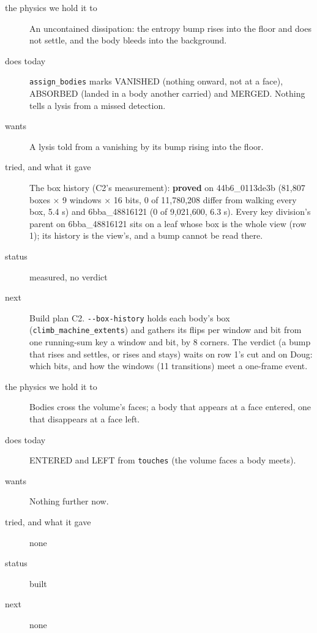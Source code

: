 \begin{description}
\item[{the physics we hold it to}] An uncontained dissipation: the entropy bump rises into the floor and does not settle, and the body bleeds into the background.
\item[{does today}] \texttt{assign\_\allowbreak{}bodies} marks VANISHED (nothing onward, not at a face), ABSORBED (landed in a body another carried) and MERGED. Nothing tells a lysis from a missed detection.
\item[{wants}] A lysis told from a vanishing by its bump rising into the floor.
\item[{tried, and what it gave}] The box history (C2's measurement): \textbf{proved} on 44b6\_\allowbreak{}0113de3b (81,807 boxes × 9 windows × 16 bits, 0 of 11,780,208 differ from walking every box, 5.4 s) and 6bba\_\allowbreak{}48816121 (0 of 9,021,600, 6.3 s). Every key division's parent on 6bba\_\allowbreak{}48816121 sits on a leaf whose box is the whole view (row 1); its history is the view's, and a bump cannot be read there.
\item[{status}] measured, no verdict
\item[{next}] Build plan C2. \texttt{-\allowbreak{}-\allowbreak{}box-\allowbreak{}history} holds each body's box (\texttt{climb\_\allowbreak{}machine\_\allowbreak{}extents}) and gathers its flips per window and bit from one running-sum key a window and bit, by 8 corners. The verdict (a bump that rises and settles, or rises and stays) waits on row 1's cut and on Doug: which bits, and how the windows (11 transitions) meet a one-frame event.
\end{description}

\begin{description}
\item[{the physics we hold it to}] Bodies cross the volume's faces; a body that appears at a face entered, one that disappears at a face left.
\item[{does today}] ENTERED and LEFT from \texttt{touches} (the volume faces a body meets).
\item[{wants}] Nothing further now.
\item[{tried, and what it gave}] none
\item[{status}] built
\item[{next}] none
\end{description}

